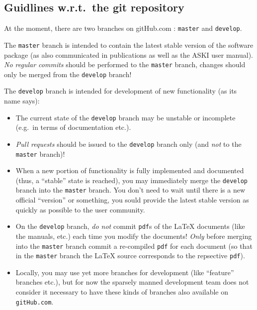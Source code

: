 \documentclass[12pt,a4paper]{article}
\newcommand{\lcode}[1]{\nolinkurl{#1}}
\newcommand{\lcodetitle}[1]{ {\ttfamily #1} }
\newcommand{\ASKI}{ {\ttfamily ASKI} }
\begin{document}
\subsection*{Guidlines w.r.t.\ the \lcodetitle{git} repository}
At the moment, there are two branches on \lcodetitle{gitHub.com}: \lcode{master} and \lcode{develop}.

The \lcode{master} branch is intended to contain the latest stable version of the software package
(as also communicated in publications as well as the \ASKI{} user manual). \emph{No regular commits}
should be performed to the \lcode{master} branch, changes should only be merged from the \lcode{develop}
branch!

The \lcode{develop} branch is intended for development of new functionality (as its name says):
\begin{itemize}
\item The current state of the \lcode{develop} branch may be unstable or incomplete (e.g.\ in terms of documentation etc.).
\item \emph{Pull requests} should be issued to the \lcode{develop} branch only (and \emph{not} to the \lcode{master} branch)!
\item When a new portion of functionality is fully implemented and documented (thus, a ``stable'' state is reached), you may
  immediately merge the \lcode{develop} branch into the \lcode{master} branch. You don't need to wait until there is a new
  official ``version'' or something, you sould provide the latest stable version as quickly as possible to the user community.
\item On the \lcode{develop} branch, \emph{do not} commit \lcode{pdf}s of the \LaTeX{} documents (like the manuals, etc.) 
  each time you modify the documents! \emph{Only} before merging into the \lcode{master} branch commit a re-compiled \lcode{pdf}
  for each document (so that in the \lcode{master} branch the \LaTeX{} source corresponds to the repsective \lcode{pdf}).
\item Locally, you may use yet more branches for development (like ``feature'' branches etc.), but for now the sparsely manned 
development team does not consider it necessary to have these kinds of branches also available on \lcode{gitHub.com}.
\end{itemize}
\end{document}
